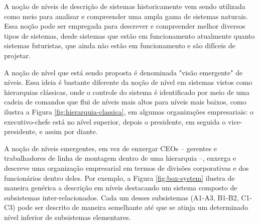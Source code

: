     
    A noção de níveis de descrição de sistemas historicamente vem sendo utilizada como meio para analisar e compreender uma ampla gama de sistemas naturais. Essa noção pode ser empregada para descrever e compreender melhor diversos tipos de sistemas, desde sistemas que estão em funcionamento atualmente quanto sistemas futuristas, que ainda não estão em funcionamento e são difíceis de projetar.
    
    A noção de nível que está sendo proposta é denominada "visão emergente" de níveis. Essa ideia é bastante diferente da noção de nível em sistemas vistos como hierarquias clássicas, onde o controle do sistema é identificado por meio de uma cadeia de comandos que flui de níveis mais altos para níveis mais baixos, como ilustra a Figura \ref{fig:hierarquia-classica}, em algumas organizações empresariais: o executivo-chefe está no nível superior, depois o presidente, em seguida o vice-presidente, e assim por diante.

    \begin{figure}[!ht]
        \centering
    \end{figure}
    
    A noção de níveis emergentes, em vez de enxergar CEOs -- gerentes e trabalhadores de linha de montagem dentro de uma hierarquia --, enxerga e descreve uma organização empresarial em termos de divisões corporativas e dos funcionários dentro deles. Por exemplo, a Figura \ref{fig:box-system} ilustra de maneira genérica a descrição em níveis destacando um sistema composto de subsistemas inter-relacionados. Cada um desses subsistemas (A1-A3, B1-B2, C1-C3) pode ser descrito de maneira semelhante até que se atinja um determinado nível inferior de subsistemas elementares.
    
